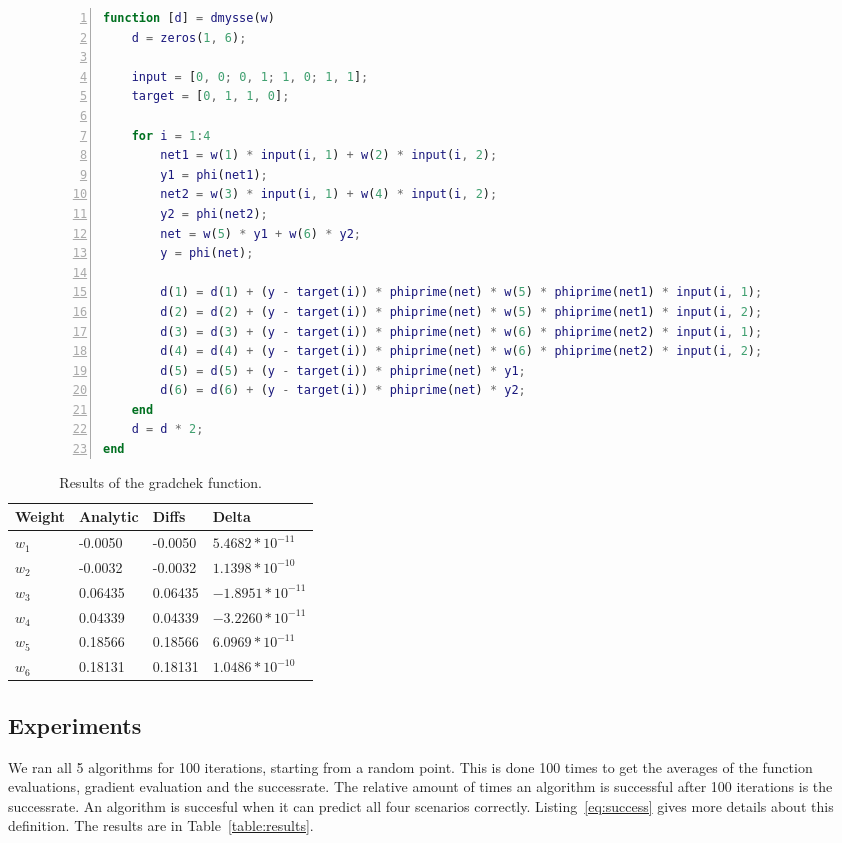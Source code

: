 \documentclass{article}
\begin{document}
\begin{figure}
	\begin{lstlisting}[caption={The computation of the derivatives of the sum squared error of the weights.}, label={listing:dmysse}, captionpos=b, language=matlab, numbers=left, tabsize=4, frame=single, basicstyle=\footnotesize, breaklines=true, deletekeywords={input, zeros}]
function [d] = dmysse(w)
	d = zeros(1, 6);

	input = [0, 0; 0, 1; 1, 0; 1, 1];
	target = [0, 1, 1, 0];

	for i = 1:4
		net1 = w(1) * input(i, 1) + w(2) * input(i, 2);
		y1 = phi(net1);
		net2 = w(3) * input(i, 1) + w(4) * input(i, 2);
		y2 = phi(net2);
		net = w(5) * y1 + w(6) * y2; 
		y = phi(net);
	
		d(1) = d(1) + (y - target(i)) * phiprime(net) * w(5) * phiprime(net1) * input(i, 1);
		d(2) = d(2) + (y - target(i)) * phiprime(net) * w(5) * phiprime(net1) * input(i, 2);
		d(3) = d(3) + (y - target(i)) * phiprime(net) * w(6) * phiprime(net2) * input(i, 1);
		d(4) = d(4) + (y - target(i)) * phiprime(net) * w(6) * phiprime(net2) * input(i, 2);
		d(5) = d(5) + (y - target(i)) * phiprime(net) * y1;
		d(6) = d(6) + (y - target(i)) * phiprime(net) * y2;
	end
	d = d * 2;
end
	\end{lstlisting}
\end{figure}

\begin{table}[H]
	\centering
	\begin{tabular}{| l | l | l | l |}
		\hline
		Weight & Analytic & Diffs & Delta \\ \hline
$w_1$ & -0.0050 & -0.0050 & $5.4682*10^{-11}$ \\ \hline
$w_2$ & -0.0032 & -0.0032 & $1.1398*10^{-10}$ \\ \hline
$w_3$ & 0.06435 & 0.06435 & $-1.8951*10^{-11}$ \\ \hline
$w_4$ & 0.04339 & 0.04339 & $-3.2260*10^{-11}$ \\ \hline
$w_5$ & 0.18566 & 0.18566 & $6.0969*10^{-11}$ \\ \hline
$w_6$ & 0.18131 & 0.18131 & $1.0486*10^{-10}$ \\ \hline
	\end{tabular}
	\caption{Results of the gradchek function.}
	\label{table:gradchek}
\end{table}

\subsection{Experiments}
We ran all 5 algorithms for 100 iterations, starting from a random point. This is done 100 times to get the averages of the function evaluations, gradient evaluation and the successrate. The relative amount of times an algorithm is successful after 100 iterations is the successrate. An algorithm is succesful when it can predict all four scenarios correctly. Listing~\ref{eq:success} gives more details about this definition. The results are in Table~\ref{table:results}. 
\end{document}
